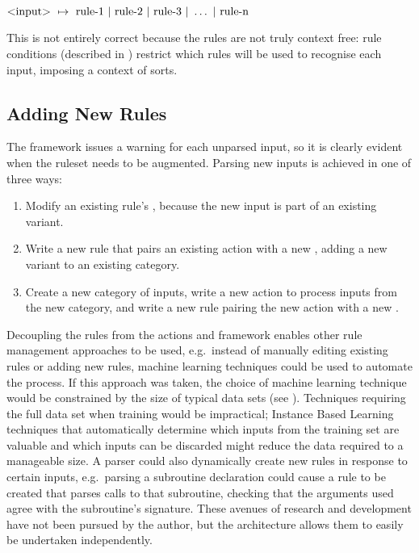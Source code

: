 \tab{}$\text{\textless{}input\textgreater{}}~\mapsto{}~\text{rule-1}~|~\text{rule-2}~|~\text{rule-3}~|~\dots~|~\text{rule-n}$

This is not entirely correct because the rules are not truly context free:
rule conditions (described in )
restrict which rules will be used to recognise each input, imposing a
context of sorts.

\subsection{Adding New Rules}

\label{adding new rules in architecture}

The framework issues a warning for each unparsed input, so it is clearly
evident when the ruleset needs to be augmented.  Parsing new inputs is
achieved in one of three ways:

\begin{enumerate}

    \item Modify an existing rule's , because the new input
        is part of an existing variant.

    \item Write a new rule that pairs an existing action with a new
        , adding a new variant to an existing category.

    \item Create a new category of inputs, write a new action to process
        inputs from the new category, and write a new rule pairing the new
        action with a new .

\end{enumerate}

Decoupling the rules from the actions and framework enables other rule
management approaches to be used, e.g.\ instead of manually editing
existing rules or adding new rules, machine learning techniques could be
used to automate the process.  If this approach was taken, the choice of
machine learning technique would be constrained by the size of typical data
sets (see ).  Techniques requiring the full
data set when training would be impractical; Instance Based
Learning~\cite{instance-based-learning} techniques that automatically
determine which inputs from the training set are valuable and which inputs
can be discarded might reduce the data required to a manageable size.  A
parser could also dynamically create new rules in response to certain
inputs, e.g.\ parsing a subroutine declaration could cause a rule to be
created that parses calls to that subroutine, checking that the arguments
used agree with the subroutine's signature.  These avenues of research and
development have not been pursued by the author, but the architecture
allows them to easily be undertaken independently.


